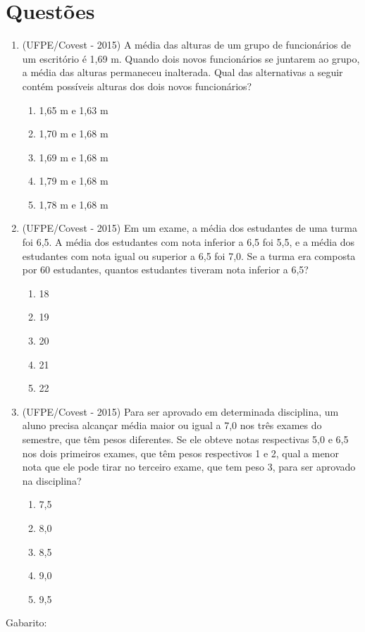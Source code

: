 \section{Questões}
\begin{enumerate}
 \item (UFPE/Covest - 2015) A média das alturas de um grupo de funcionários de um escritório é 1,69 m. Quando dois novos funcionários se juntarem ao grupo, a média das alturas permaneceu inalterada. Qual das alternativas a seguir contém possíveis alturas dos dois novos funcionários?
 \begin{enumerate}
 \item 1,65 m e 1,63 m
 \item 1,70 m e 1,68 m
 \item 1,69 m e 1,68 m
 \item 1,79 m e 1,68 m
 \item 1,78 m e 1,68 m
 \end{enumerate}
 
 \item (UFPE/Covest - 2015) Em um exame, a média dos estudantes de uma turma foi 6,5. A média dos estudantes com nota inferior a 6,5 foi 5,5, e a média dos estudantes com nota igual ou superior a 6,5 foi 7,0. Se a turma era composta por 60 estudantes, quantos estudantes tiveram nota inferior a 6,5?
 \begin{enumerate}
 \item 18
 \item 19
 \item 20
 \item 21
 \item 22
 \end{enumerate}
 
 \item (UFPE/Covest - 2015) Para ser aprovado em determinada disciplina, um aluno precisa alcançar média maior ou igual a 7,0 nos três exames do semestre, que têm pesos diferentes. Se ele obteve notas respectivas 5,0 e 6,5 nos dois primeiros exames, que têm pesos respectivos 1 e 2, qual a menor nota que ele pode tirar no terceiro exame, que tem peso 3, para ser aprovado na disciplina?
 \begin{enumerate}
 \item 7,5
 \item 8,0
 \item 8,5
 \item 9,0
 \item 9,5
 \end{enumerate}
 
 
\end{enumerate}

Gabarito: 
